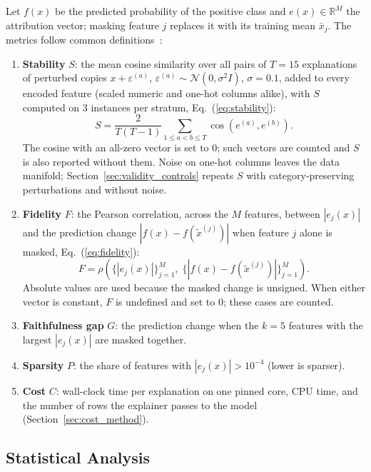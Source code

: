\documentclass[11pt,a4paper]{article}
\begin{document}
Let $f(x)$ be the predicted probability of the positive class and
$e(x) \in \mathbb{R}^{M}$ the attribution vector; masking feature $j$
replaces it with its training mean $\bar{x}_j$. The metrics follow common
definitions~\cite{alvarezmelis2018robustness,bhatt2020evaluating,samek2017evaluating}:
\begin{enumerate}
\item \textbf{Stability} $S$: the mean cosine similarity over all pairs of
$T = 15$ explanations of perturbed copies $x + \varepsilon^{(a)}$,
$\varepsilon^{(a)} \sim \mathcal{N}(0, \sigma^2 I)$, $\sigma = 0.1$, added to
every encoded feature (scaled numeric and one-hot columns alike), with $S$
computed on 3 instances per stratum, Eq.~(\ref{eq:stability}):
\begin{equation}
S = \frac{2}{T(T-1)}\sum_{1 \le a<b \le T}\cos\!\left(e^{(a)},e^{(b)}\right).
\label{eq:stability}
\end{equation}
The cosine with an all-zero vector is set to 0; such vectors are counted
and $S$ is also reported without them. Noise on one-hot columns leaves the
data manifold; Section~\ref{sec:validity_controls} repeats $S$ with
category-preserving perturbations and without noise.
\item \textbf{Fidelity} $F$: the Pearson correlation, across the $M$
features, between $|e_j(x)|$ and the prediction change
$|f(x) - f(\tilde{x}^{(j)})|$ when feature $j$ alone is masked,
Eq.~(\ref{eq:fidelity}):
\begin{equation}
F = \rho\!\left(\bigl\{|e_j(x)|\bigr\}_{j=1}^{M},\;
\bigl\{|f(x) - f(\tilde{x}^{(j)})|\bigr\}_{j=1}^{M}\right).
\label{eq:fidelity}
\end{equation}
Absolute values are used because the masked change is unsigned. When
either vector is constant, $F$ is undefined and set to 0; these cases are
counted.
\item \textbf{Faithfulness gap} $G$: the prediction change when the $k = 5$
features with the largest $|e_j(x)|$ are masked together.
\item \textbf{Sparsity} $P$: the share of features with
$|e_j(x)| > 10^{-4}$ (lower is sparser).
\item \textbf{Cost} $C$: wall-clock time per explanation on one pinned core,
CPU time, and the number of rows
the explainer passes to the model (Section~\ref{sec:cost_method}).
\end{enumerate}

\subsection{Statistical Analysis}
\label{sec:inference}
\end{document}
